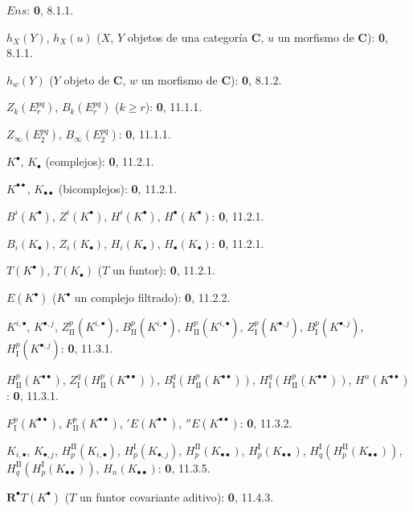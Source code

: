 \documentclass[10pt,oneside,openany]{book}
\theoremstyle{egaenv}\newtheorem*{env}{---}
\theoremstyle{egastatement}
\theoremstyle{egadescription}
\renewcommand{\geq}{\geqslant}
\begin{document}
\begin{flushleft}
$\boldsymbol{\mathit{Ens}}$: \textbf 0, 8.1.1.

$h_X(Y)$, $h_X(u)$ ($X$, $Y$ objetos de una categoría $\boldsymbol{C}$, $u$ un morfismo
de $\boldsymbol{C}$): \textbf 0, 8.1.1.

$h_w(Y)$ ($Y$ objeto de $\boldsymbol{C}$, $w$ un morfismo de $\boldsymbol{C}$): \textbf 0, 8.1.2.

$Z_k(E_r^{pq})$, $B_k(E_r^{pq})$ ($k\geq r$): \textbf 0, 11.1.1.

$Z_\infty(E_2^{pq})$, $B_\infty(E_2^{pq})$: \textbf 0, 11.1.1.

$K^\bullet$, $K_\bullet$ (complejos): \textbf 0, 11.2.1.

$K^{\bullet\bullet}$, $K_{\bullet\bullet}$ (bicomplejos): \textbf 0, 11.2.1.

$B^i(K^\bullet)$, $Z^i(K^\bullet)$, $H^i(K^\bullet)$,
$H^\bullet(K^\bullet)$: \textbf 0, 11.2.1.

$B_i(K_\bullet)$, $Z_i(K_\bullet)$, $H_i(K_\bullet)$,
$H_\bullet(K_\bullet)$: \textbf 0, 11.2.1.

$T(K^\bullet)$, $T(K_\bullet)$ ($T$ un funtor): \textbf 0, 11.2.1.

$E(K^\bullet)$ ($K^\bullet$ un complejo filtrado): \textbf 0, 11.2.2.

$K^{i,\bullet}$, $K^{\bullet,j}$, $Z_{\mathrm{II}}^p(K^{i,\bullet})$,
$B_{\mathrm{II}}^p(K^{i,\bullet})$, $H_{\mathrm{II}}^p(K^{i,\bullet})$,
$Z_{\mathrm I}^p(K^{\bullet,j})$, $B_{\mathrm I}^p(K^{\bullet,j})$,
$H_{\mathrm I}^p(K^{\bullet,j})$: \textbf 0, 11.3.1.

$H_{\mathrm{II}}^p(K^{\bullet\bullet})$,
$Z_{\mathrm I}^q(H_{\mathrm{II}}^p(K^{\bullet\bullet}))$,
$B_{\mathrm I}^q(H_{\mathrm{II}}^p(K^{\bullet\bullet}))$,
$H_{\mathrm I}^q(H_{\mathrm{II}}^p(K^{\bullet\bullet}))$,
$H^n(K^{\bullet\bullet})$: \textbf 0, 11.3.1.

$F_{\mathrm I}^p(K^{\bullet\bullet})$,
$F_{\mathrm{II}}^p(K^{\bullet\bullet})$, ${}'E(K^{\bullet\bullet})$,
${}''E(K^{\bullet\bullet})$: \textbf 0, 11.3.2.

$K_{i,\bullet}$, $K_{\bullet,j}$, $H_p^{\mathrm{II}}(K_{i,\bullet})$,
$H_p^{\mathrm I}(K_{\bullet,j})$, $H_p^{\mathrm{II}}(K_{\bullet\bullet})$,
$H_p^{\mathrm I}(K_{\bullet\bullet})$,
$H_q^{\mathrm I}(H_p^{\mathrm{II}}(K_{\bullet\bullet}))$,
$H_q^{\mathrm{II}}(H_p^{\mathrm I}(K_{\bullet\bullet}))$,
$H_n(K_{\bullet\bullet})$: \textbf 0, 11.3.5.

$\mathbf R^\bullet T(K^\bullet)$ ($T$ un funtor covariante aditivo): \textbf 0, 11.4.3.


\end{flushleft}
\end{document}
